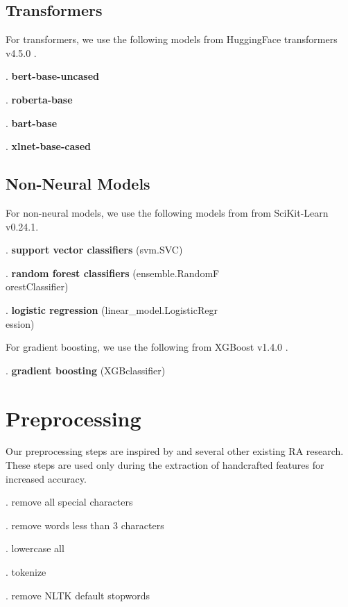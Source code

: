 \documentclass[11pt]{article}
\begin{document}
\subsection{Transformers}
\noindent
For transformers, we use the following models from HuggingFace transformers v4.5.0 \citep{wolf-etal-2020-transformers}.

. \textbf{bert-base-uncased}

. \textbf{roberta-base}

. \textbf{bart-base}

. \textbf{xlnet-base-cased} 

\subsection{Non-Neural Models}
\noindent
For non-neural models, we use the following models from from SciKit-Learn v0.24.1.

. \textbf{support vector classifiers} (svm.SVC) \citep{10.1109/5254.708428, Platt99probabilisticoutputs,chang2011libsvm}

. \textbf{random forest classifiers} (ensemble.RandomF\\orestClassifier) \citep{breiman2001random}

. \textbf{logistic regression} (linear\_model.LogisticRegr\\ession) 

For gradient boosting, we use the following from XGBoost v1.4.0 \citep{chen2016xgboost}.

. \textbf{gradient boosting} (XGBclassifier)

\section{Preprocessing}
Our preprocessing steps are inspired by \citet{Martinc:21} and several other existing RA research. These steps are used only during the extraction of handcrafted features for increased accuracy. 

. remove all special characters

. remove words less than 3 characters

. lowercase all

. tokenize

. remove NLTK default stopwords
\end{document}
